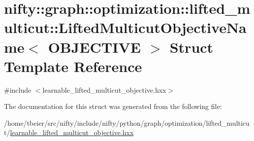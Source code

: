 \hypertarget{structnifty_1_1graph_1_1optimization_1_1lifted__multicut_1_1LiftedMulticutObjectiveName}{}\section{nifty\+:\+:graph\+:\+:optimization\+:\+:lifted\+\_\+multicut\+:\+:Lifted\+Multicut\+Objective\+Name$<$ O\+B\+J\+E\+C\+T\+I\+V\+E $>$ Struct Template Reference}
\label{structnifty_1_1graph_1_1optimization_1_1lifted__multicut_1_1LiftedMulticutObjectiveName}


{\ttfamily \#include $<$learnable\+\_\+lifted\+\_\+multicut\+\_\+objective.\+hxx$>$}



The documentation for this struct was generated from the following file\+:\begin{DoxyCompactItemize}
\item 
/home/tbeier/src/nifty/include/nifty/python/graph/optimization/lifted\+\_\+multicut/\hyperlink{learnable__lifted__multicut__objective_8hxx}{learnable\+\_\+lifted\+\_\+multicut\+\_\+objective.\+hxx}\end{DoxyCompactItemize}
